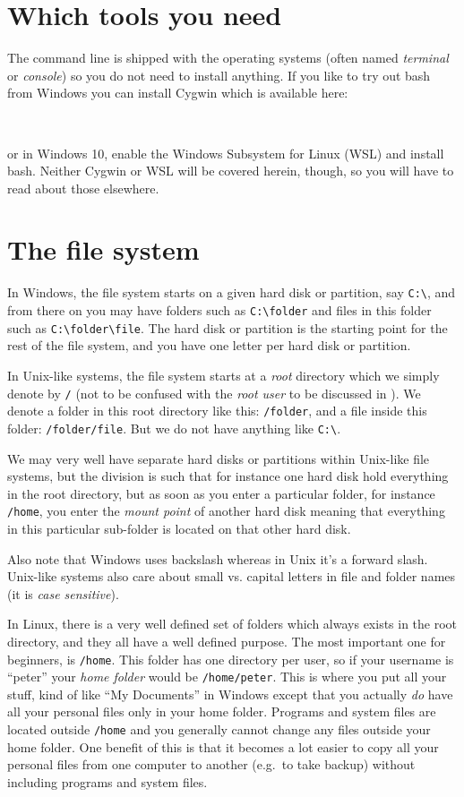 \section{Which tools you need}
The command line is shipped with the operating systems (often named \emph{terminal} or \emph{console}) so you do not need to install anything. If you like to try out bash from Windows you can install Cygwin which is available here:

~\\

or in Windows 10, enable the Windows Subsystem for Linux (WSL) and install bash. Neither Cygwin or WSL will be covered herein, though, so you will have to read about those elsewhere.

\section{The file system}
In Windows, the file system starts on a given hard disk or partition, say \verb|C:\|, and from there on you may have folders such as \verb|C:\folder| and files in this folder such as \verb|C:\folder\file|. The hard disk or partition is the starting point for the rest of the file system, and you have one letter per hard disk or partition.

In Unix-like systems, the file system starts at a \emph{root} directory which we simply denote by \verb|/| (not to be confused with the \emph{root user} to be discussed in ). We denote a folder in this root directory like this: \verb|/folder|, and a file inside this folder: \verb|/folder/file|. But we do not have anything like \verb|C:\|. 

We may very well have separate hard disks or partitions within Unix-like file systems, but the division is such that for instance one hard disk hold everything in the root directory, but as soon as you enter a particular folder, for instance \verb|/home|, you enter the \emph{mount point} of another hard disk meaning that everything in this particular sub-folder is located on that other hard disk.

Also note that Windows uses backslash whereas in Unix it's a forward slash. Unix-like systems also care about small vs. capital letters in file and folder names (it is \emph{case sensitive}).

In Linux, there is a very well defined set of folders which always exists in the root directory, and they all have a well defined purpose. The most important one for beginners, is \verb|/home|. This folder has one directory per user, so if your username is ``peter'' your \emph{home folder} would be \verb|/home/peter|. This is where you put all your stuff, kind of like ``My Documents'' in Windows except that you actually \emph{do} have all your personal files only in your home folder. Programs and system files are located outside \verb|/home| and you generally cannot change any files outside your home folder. One benefit of this is that it becomes a lot easier to copy all your personal files from one computer to another (e.g.\ to take backup) without including programs and system files.

